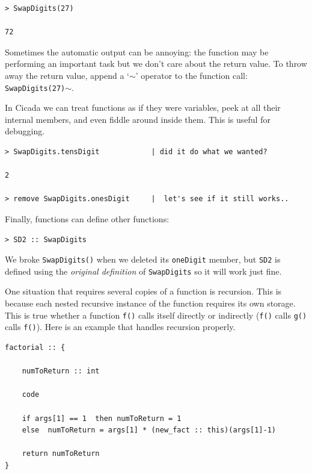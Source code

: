\documentclass{article}
\newenvironment{code}{
       \begin{list}{}{
               \setlength{\leftmargin}{.4in}
               \setlength{\rightmargin}{0in}
               \setlength{\topsep}{.2in}
       }
       \small
       \item[] }
       { \end{list}   }
\begin{document}
\begin{code} \begin{verbatim}
> SwapDigits(27)

72
\end{verbatim} \end{code}

\noindent Sometimes the automatic output can be annoying:  the function may be performing an important task but we don't care about the return value.  To throw away the return value, append a `$\sim$' operator to the function call:  \texttt{SwapDigits(27)}$\sim$.

In Cicada we can treat functions as if they were variables, peek at all their internal members, and even fiddle around inside them.  This is useful for debugging.

\begin{code} \begin{verbatim}
> SwapDigits.tensDigit            | did it do what we wanted?

2

> remove SwapDigits.onesDigit     |  let's see if it still works..
\end{verbatim} \end{code}

Finally, functions can define other functions:

\begin{code} \begin{verbatim}
> SD2 :: SwapDigits
\end{verbatim} \end{code}

\noindent We broke \verb#SwapDigits()# when we deleted its \verb#oneDigit# member, but \verb#SD2# is defined using the \emph{original definition} of \verb#SwapDigits# so it will work just fine.

One situation that requires several copies of a function is recursion.  This is because each nested recursive instance of the function requires its own storage.  This is true whether a function \verb#f()# calls itself directly or indirectly (\verb#f()# calls \verb#g()# calls \verb#f()#).  Here is an example that handles recursion properly.

\begin{code} \begin{verbatim}
factorial :: {
    
    numToReturn :: int
    
    code
    
    if args[1] == 1  then numToReturn = 1
    else  numToReturn = args[1] * (new_fact :: this)(args[1]-1)
    
    return numToReturn
}
\end{verbatim} \end{code}
\end{document}
